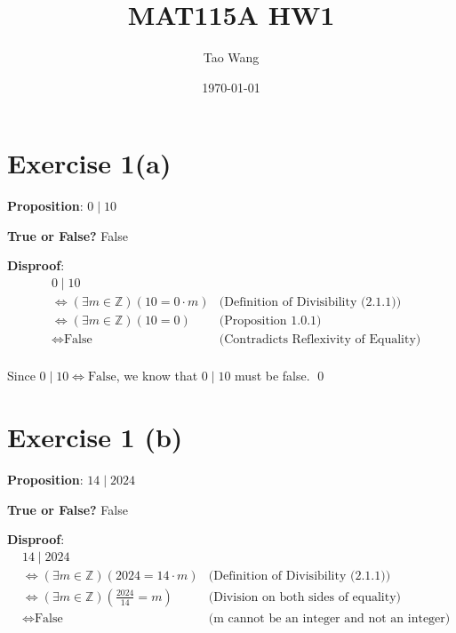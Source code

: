 \documentclass{article} %
\begin{document}
\title{MAT115A HW1}
\author{Tao Wang}
\date{\today}

\maketitle

\section*{Exercise 1(a)}

\bigskip
\noindent
\textbf{Proposition}: $0 \mid 10$

\bigskip
\noindent
\textbf{True or False?} False

\bigskip
\noindent
\textbf{Disproof}:
\begin{align*}
     & 0 \mid 10                                       &                                              \\
     & \iff (\exists m \in \mathbb{Z})(10 = 0 \cdot m) & \text{(Definition of Divisibility (2.1.1))}  \\
     & \iff (\exists m \in \mathbb{Z})(10 = 0)         & \text{(Proposition 1.0.1)}                   \\
     & \iff \text{False}                               & \text{(Contradicts Reflexivity of Equality)} \\
\end{align*}

Since $0 \mid 10 \iff \text{False}$, we know that $0 \mid 10$ must be false.
\qed
\bigskip

\section*{Exercise 1 (b)}

\bigskip
\noindent
\textbf{Proposition}: $14 \mid 2024$

\bigskip
\noindent
\textbf{True or False?} False

\bigskip
\noindent
\textbf{Disproof}:
\begin{align*}
     & 14 \mid 2024                                                    &                                                    \\
     & \iff (\exists m \in \mathbb{Z})(2024 = 14 \cdot m)              & \text{(Definition of Divisibility (2.1.1))}        \\
     & \iff (\exists m \in \mathbb{Z})\left(\frac{2024}{14} = m\right) & \text{(Division on both sides of equality)}        \\
     & \iff \text{False}                                               & \text{(m cannot be an integer and not an integer)} \\
\end{align*}
\end{document}
